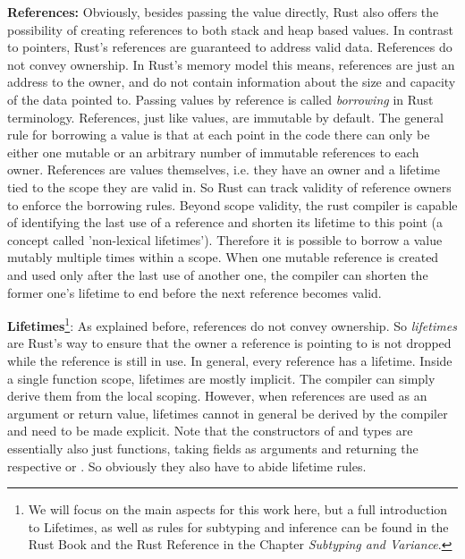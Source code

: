 \textbf{References:} Obviously, besides passing the value directly, Rust also offers the possibility of creating references to both stack and heap based values. In contrast to pointers, Rust's references are guaranteed to address valid data. References do not convey ownership. In Rust's memory model this means, references are just an address to the owner, and do not contain information about the size and capacity of the data pointed to. Passing values by reference is called \emph{borrowing} in Rust terminology. References, just like values, are immutable by default. The general rule for borrowing a value is that at each point in the code there can only be either one mutable or an arbitrary number of immutable references to each owner. References are values themselves, i.e. they have an owner and a lifetime tied to the scope they are valid in. So Rust can track validity of reference owners to enforce the borrowing rules. Beyond scope validity, the rust compiler is capable of identifying the last use of a reference and shorten its lifetime to this point (a concept called 'non-lexical lifetimes'). Therefore it is possible to borrow a value mutably multiple times within a scope. When one mutable reference is created and used only after the last use of another one, the compiler can shorten the former one's lifetime to end before the next reference becomes valid. 

\textbf{Lifetimes}\footnote{We will focus on the main aspects for this work here, but a full introduction to Lifetimes, as well as rules for subtyping and inference can be found in the Rust Book\cite{rustbook} and the Rust Reference\cite{rustreference} in the Chapter \emph{Subtyping and Variance}.}: As explained before, references do not convey ownership. So \emph{lifetimes} are Rust's way to ensure that the owner a reference is pointing to is not dropped while the reference is still in use. 
In general, every reference has a lifetime. Inside a single function scope, lifetimes are mostly implicit. The compiler can simply derive them from the local scoping. However, when references are used as an argument or return value, lifetimes cannot in general be derived by the compiler and need to be made explicit. Note that the constructors of  and  types are essentially also just functions, taking fields as arguments and returning the respective  or . So obviously they also have to abide lifetime rules. 

